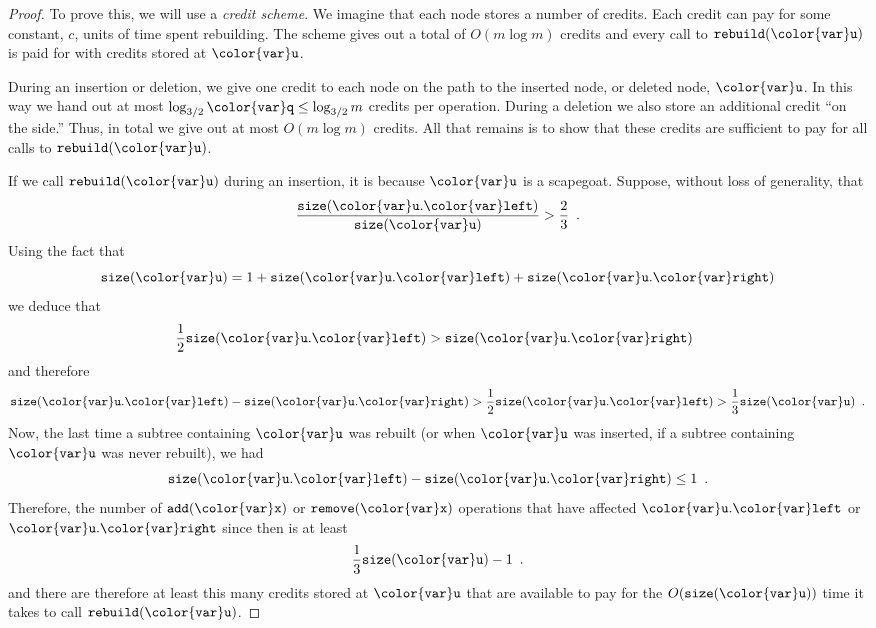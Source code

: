 \documentclass[10pt]{book}
\theoremstyle{plain}
\theoremstyle{definition}
\begin{document}
\begin{proof}
  To prove this, we will use a \emph{credit scheme}.
  We imagine that each node
  stores a number of credits.  Each credit can pay for some constant,
  $c$, units of time spent rebuilding.  The scheme gives out a total of
  $O(m\log m)$ credits and every call to \ensuremath{\mathtt{rebuild({\color{var}u})}} is paid for with
  credits stored at \ensuremath{\mathtt{{\color{var}u}}}.

  During an insertion or deletion, we give one credit to each node on the
  path to the inserted node, or deleted node, \ensuremath{\mathtt{{\color{var}u}}}.  In this way we hand
  out at most $\log_{3/2}\ensuremath{\mathtt{{\color{var}q}}}\le \log_{3/2}m$ credits per operation.
  During a deletion we also store an additional credit ``on the side.''
  Thus, in total we give out at most $O(m\log m)$ credits.  All that
  remains is to show that these credits are sufficient to pay for all
  calls to \ensuremath{\mathtt{rebuild({\color{var}u})}}.

  If we call \ensuremath{\mathtt{rebuild({\color{var}u})}} during an insertion, it is because \ensuremath{\mathtt{{\color{var}u}}} is
  a scapegoat.  Suppose, without loss of generality, that
  \[
    \frac{\ensuremath{\mathtt{size({\color{var}u}.{\color{var}left})}}}{\ensuremath{\mathtt{size({\color{var}u})}}} > \frac{2}{3} \enspace .
  \]
  Using the fact that
  \[
    \ensuremath{\mathtt{size({\color{var}u})}} = 1 + \ensuremath{\mathtt{size({\color{var}u}.{\color{var}left})}} + \ensuremath{\mathtt{size({\color{var}u}.{\color{var}right})}} 
  \]
  we deduce that
  \[
    \frac{1}{2}\ensuremath{\mathtt{size({\color{var}u}.{\color{var}left})}} > \ensuremath{\mathtt{size({\color{var}u}.{\color{var}right})}}  \enspace 
  \]
  and therefore
  \[
    \ensuremath{\mathtt{size({\color{var}u}.{\color{var}left})}} - \ensuremath{\mathtt{size({\color{var}u}.{\color{var}right})}} > \frac{1}{2}\ensuremath{\mathtt{size({\color{var}u}.{\color{var}left})}} >
    \frac{1}{3}\ensuremath{\mathtt{size({\color{var}u})}}  \enspace .
  \]
  Now, the last time a subtree containing \ensuremath{\mathtt{{\color{var}u}}} was rebuilt (or when \ensuremath{\mathtt{{\color{var}u}}}
  was inserted, if a subtree containing \ensuremath{\mathtt{{\color{var}u}}} was never rebuilt), we had
  \[
    \ensuremath{\mathtt{size({\color{var}u}.{\color{var}left})}} - \ensuremath{\mathtt{size({\color{var}u}.{\color{var}right})}} \le 1 \enspace .
  \]
  Therefore, the number of \ensuremath{\mathtt{add({\color{var}x})}} or \ensuremath{\mathtt{remove({\color{var}x})}} operations that have
  affected \ensuremath{\mathtt{{\color{var}u}.{\color{var}left}}} or \ensuremath{\mathtt{{\color{var}u}.{\color{var}right}}} since then is at least
  \[
    \frac{1}{3}\ensuremath{\mathtt{size({\color{var}u})}} - 1 \enspace . 
  \]
  and there are therefore at least this many credits stored at \ensuremath{\mathtt{{\color{var}u}}}
  that are available to pay for the $O(\ensuremath{\mathtt{size({\color{var}u})}})$ time it takes to
  call \ensuremath{\mathtt{rebuild({\color{var}u})}}.


\end{proof}
\end{document}
